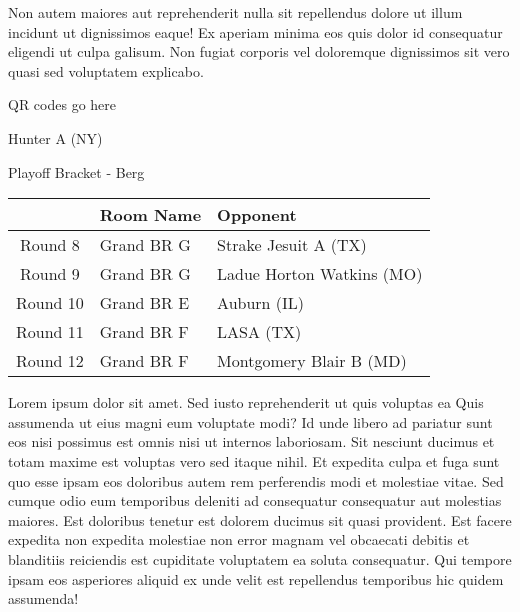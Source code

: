 \documentclass{article}%
\begin{document}
\newline%
Non autem maiores aut reprehenderit nulla sit repellendus dolore ut illum incidunt ut dignissimos eaque! Ex aperiam minima eos quis dolor id consequatur eligendi ut culpa galisum. Non fugiat corporis vel doloremque dignissimos sit vero quasi sed voluptatem explicabo.\newline%
\newline%
%
\vspace*{30pt}%
\begin{center}%
\begin{Huge}%
QR codes go here%
\end{Huge}%
\end{center}%
\newpage%
\begin{center}%
\begin{Huge}%
Hunter A (NY)%
\end{Huge}%
\vspace*{8pt}%
\linebreak%
\begin{Large}%
Playoff Bracket {-} Berg%
\end{Large}%
\end{center}%
%
\begin{tabularx}{\textwidth}{|c|Y|Y|}%
\hline%
&Room Name&Opponent\\%
\hline%
Round 8&Grand BR G&Strake Jesuit A (TX)\\%
Round 9&Grand BR G&Ladue Horton Watkins (MO)\\%
Round 10&Grand BR E&Auburn (IL)\\%
Round 11&Grand BR F&LASA (TX)\\%
Round 12&Grand BR F&Montgomery Blair B (MD)\\%
\hline%
\end{tabularx}%
\vspace*{8pt}%
\linebreak%
\newline%
\newline%
Lorem ipsum dolor sit amet. Sed iusto reprehenderit ut quis voluptas ea Quis assumenda ut eius magni eum voluptate modi? Id unde libero ad pariatur sunt eos nisi possimus est omnis nisi ut internos laboriosam. Sit nesciunt ducimus et totam maxime est voluptas vero sed itaque nihil. Et expedita culpa et fuga sunt quo esse ipsam eos doloribus autem rem perferendis modi et molestiae vitae.\newline%
\newline%
Sed cumque odio eum temporibus deleniti ad consequatur consequatur aut molestias maiores. Est doloribus tenetur est dolorem ducimus sit quasi provident. Est facere expedita non expedita molestiae non error magnam vel obcaecati debitis et blanditiis reiciendis est cupiditate voluptatem ea soluta consequatur. Qui tempore ipsam eos asperiores aliquid ex unde velit est repellendus temporibus hic quidem assumenda!\newline%
\end{document}
